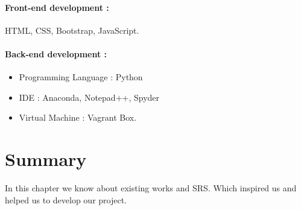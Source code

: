 \paragraph{Front-end development :}
HTML, CSS, Bootstrap, JavaScript.
\paragraph{Back-end development :}
\begin{itemize}
\item Programming Language : Python
\item IDE : Anaconda, Notepad++, Spyder
\item Virtual Machine : Vagrant Box. 
\end{itemize}

\section{Summary}
In this chapter we know about existing works and SRS. Which inspired us and helped us to develop our project.